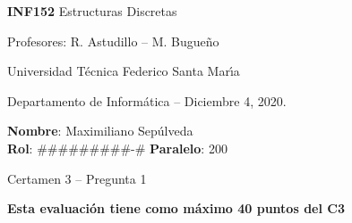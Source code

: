 \documentclass[legalpaper,10pt]{article}
\begin{document}
\thispagestyle{empty}

\begin{minipage}[t]{0.6\textwidth}

{\LARGE \textbf{INF152} Estructuras Discretas}

{\large Profesores: R. Astudillo -- M. Bugueño}

Universidad T\'ecnica Federico Santa Mar\'{\i}a

Departamento de Inform\'atica -- Diciembre 4, 2020.

\end{minipage}
\hfill
\begin{minipage}[t]{0.35\textwidth}
\textbf{Nombre}: Maximiliano Sepúlveda \\[0.3cm]
\textbf{Rol}: #########-# \textbf{Paralelo}: 200
\end{minipage}

\vspace{0.8cm}

{\Large Certamen 3 -- Pregunta 1}

\vspace{0.4cm}

\textbf{Esta evaluación tiene como máximo 40 puntos del C3}
\end{document}
